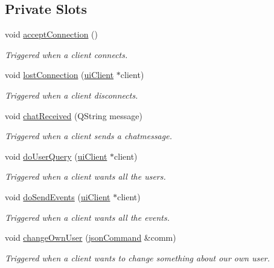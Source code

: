 \subsection*{Private Slots}
\begin{DoxyCompactItemize}
\item 
void \hyperlink{classserver_1_1ui_server_af8300a694de27369a5f5d1a95ed1cc37}{accept\-Connection} ()
\begin{DoxyCompactList}\small\item\em Triggered when a client connects. \end{DoxyCompactList}\item 
void \hyperlink{classserver_1_1ui_server_a7d6448c91d341e29919ebc10047ef4a4}{lost\-Connection} (\hyperlink{classserver_1_1ui_client}{ui\-Client} $\ast$client)
\begin{DoxyCompactList}\small\item\em Triggered when a client disconnects. \end{DoxyCompactList}\item 
void \hyperlink{classserver_1_1ui_server_ad6b939c26280e2c3c4a6306e0599a10a}{chat\-Received} (Q\-String message)
\begin{DoxyCompactList}\small\item\em Triggered when a client sends a chatmessage. \end{DoxyCompactList}\item 
void \hyperlink{classserver_1_1ui_server_af5f79bcf932095d2b0976581409e0376}{do\-User\-Query} (\hyperlink{classserver_1_1ui_client}{ui\-Client} $\ast$client)
\begin{DoxyCompactList}\small\item\em Triggered when a client wants all the users. \end{DoxyCompactList}\item 
void \hyperlink{classserver_1_1ui_server_acab729e9722d3a3c432c65248757c2f1}{do\-Send\-Events} (\hyperlink{classserver_1_1ui_client}{ui\-Client} $\ast$client)
\begin{DoxyCompactList}\small\item\em Triggered when a client wants all the events. \end{DoxyCompactList}\item 
void \hyperlink{classserver_1_1ui_server_a1d221672f6efb29189e6ce398f7b07e3}{change\-Own\-User} (\hyperlink{class_k4_u_1_1json_command}{json\-Command} \&comm)
\begin{DoxyCompactList}\small\item\em Triggered when a client wants to change something about our own user. \end{DoxyCompactList}\end{DoxyCompactItemize}
